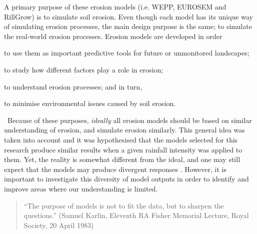 A primary purpose of these erosion models (i.e. WEPP, EUROSEM and RillGrow) is
to simulate soil erosion.
Even though each model has its unique way of simulating erosion
processes, the main design purpose is the same; to simulate the real-world
erosion processes. Erosion models are developed in order
\begin{inparaenum}[1)]
  \item to use them as important predictive tools for future or unmonitored
landscapes;
  \item to study how different factors play a role in erosion;
  \item to understand erosion processes; and in turn,
  \item to minimise environmental issues caused by soil
erosion.\end{inparaenum}\
Because of these purposes, \emph{ideally} all erosion models should be based on
similar understanding of erosion, and simulate erosion similarly. %
This general idea was taken into account and it was hypothesised that the
models selected for this research produce similar results when a given
rainfall intensity was applied to them.
Yet, the reality is somewhat different from the ideal, and one may still expect
that the models may produce divergent responses
\citep{favis-mortlock1998-141,jetten1999-521}. However, it is important to
investigate this diversity of model outputs in order to identify and improve
areas where our understanding is limited.

\begin{quotation}
\small ``The purpose of models is not to fit the data, but to sharpen the
questions.'' (Samuel Karlin, Eleventh RA Fisher Memorial Lecture, Royal Society,
20 April 1983)
\end{quotation}

